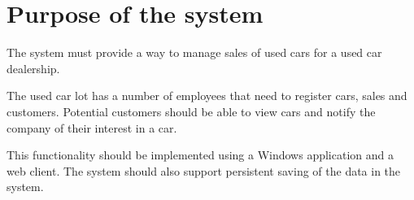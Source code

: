 \section{Purpose of the system}
The system must provide a way to manage sales of used cars for a used car dealership.

The used car lot has a number of employees that need to register cars, sales and customers. Potential customers should be able to view cars and notify the company of their interest in a car. 

This functionality should be implemented using a Windows application and a web client. The system should also support persistent saving of the data in the system.